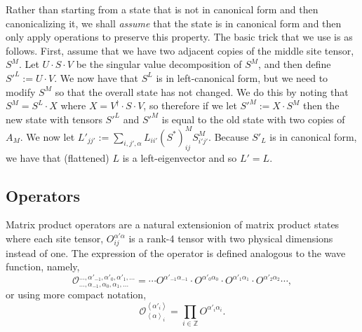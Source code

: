 \documentclass{article}
\newcommand{\seq}[1]{\left<#1\right>}
\newcommand{\Z}{\mathbb{Z}}
\begin{document}
Rather than starting from a state that is not in canonical form and then canonicalizing it, we shall \emph{assume} that the state is in canonical form and then only apply operations to preserve this property.  The basic trick that we use is as follows.  First, assume that we have two adjacent copies of the middle site tensor, $S^M$.  Let $U\cdot S\cdot V$ be the singular value decomposition of $S^M$, and then define $S'^L:=U\cdot V$.  We now have that $S^L$ is in left-canonical form, but we need to modify $S^M$ so that the overall state has not changed.  We do this by noting that $S^M=S^L\cdot X$ where $X=V^\dagger\cdot S\cdot V$, so therefore if we let $S'^M:= X\cdot S^M$ then the new state with tensors $S'^L$ and $S'^M$ is equal to the old state with two copies of $A_M$.  We now let $L'_{jj'}:=\sum_{i,j',\alpha}L_{ii'}(S^*)^M_{ij} S^M_{i'j'}.$  Because $S'_L$ is in canonical form, we have that (flattened) $L$ is a left-eigenvector and so $L'=L$.

\subsection{Operators}

Matrix product operators are a natural extensionion of matrix product states where each site tensor, $O^{\alpha'\alpha}_{ij}$ is a rank-4 tensor with two physical dimensions instead of one.  The expression of the operator is defined analogous to the wave function, namely,$$\mathcal{O}^{\dots,\alpha'_{-1},\alpha'_{0},\alpha'_1,\dots}_{\dots,\alpha_{-1},\alpha_{0},\alpha_1,\dots}= \cdots O^{\alpha'_{-1}\alpha_{-1}} \cdot O^{\alpha'_{0}\alpha_{0}}\cdot O^{\alpha'_{1}\alpha_{1}}\cdot O^{\alpha'_{2}\alpha_{2}}\cdots,$$ or using more compact notation,
$$\mathcal{O}^{\seq{\alpha'_i}}_{\seq{\alpha}_i} = \prod_{i\in\Z} O^{\alpha'_i\alpha_i}.$$
\end{document}
